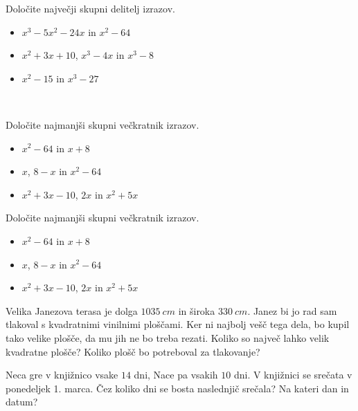             \begin{naloga}
                Določite največji skupni delitelj izrazov.
                \begin{itemize}
                    \item $x^3-5x^2-24x$ in $x^2-64$ 
                    \item $x^2+3x+10$, $x^3-4x$ in $x^3-8$ 
                    \item $x^2-15$ in $x^3-27$ 
                \end{itemize}
            \end{naloga}
~
            \begin{naloga}
                Določite najmanjši skupni večkratnik izrazov.
                \begin{itemize}
                    \item $x^2-64$ in $x+8$ 
                    \item $x$, $8-x$ in $x^2-64$ 
                    \item $x^2+3x-10$, $2x$ in $x^2+5x$ 
                \end{itemize}
            \end{naloga}

            \begin{naloga}
                Določite najmanjši skupni večkratnik izrazov.
                \begin{itemize}
                    \item $x^2-64$ in $x+8$ 
                    \item $x$, $8-x$ in $x^2-64$ 
                    \item $x^2+3x-10$, $2x$ in $x^2+5x$ 
                \end{itemize}
            \end{naloga}

            \begin{naloga}
                Velika Janezova terasa je dolga $1035~cm$ in široka $330~cm$. Janez bi jo rad sam tlakoval s kvadratnimi vinilnimi ploščami.
                Ker ni najbolj vešč tega dela, bo kupil tako velike plošče, da mu jih ne bo treba rezati.
                Koliko so največ lahko velik kvadratne plošče? Koliko plošč bo potreboval za tlakovanje? 
            \end{naloga}

            \begin{naloga}
                Neca gre v knjižnico vsake $14$ dni, Nace pa vsakih $10$ dni. V knjižnici se srečata v ponedeljek 1. marca.
                Čez koliko dni se bosta naslednjič srečala? Na kateri dan in datum?                     
            \end{naloga}

        